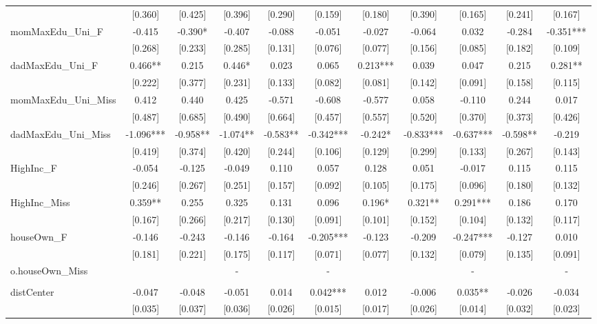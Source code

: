 \documentclass[]{article}
\begin{document}
\begin{tabular}{lcccccccccc}
 & [0.360] & [0.425] & [0.396] & [0.290] & [0.159] & [0.180] & [0.390] & [0.165] & [0.241] & [0.167] \\
momMaxEdu\_Uni\_F & -0.415 & -0.390* & -0.407 & -0.088 & -0.051 & -0.027 & -0.064 & 0.032 & -0.284 & -0.351*** \\
 & [0.268] & [0.233] & [0.285] & [0.131] & [0.076] & [0.077] & [0.156] & [0.085] & [0.182] & [0.109] \\
dadMaxEdu\_Uni\_F & 0.466** & 0.215 & 0.446* & 0.023 & 0.065 & 0.213*** & 0.039 & 0.047 & 0.215 & 0.281** \\
 & [0.222] & [0.377] & [0.231] & [0.133] & [0.082] & [0.081] & [0.142] & [0.091] & [0.158] & [0.115] \\
momMaxEdu\_Uni\_Miss & 0.412 & 0.440 & 0.425 & -0.571 & -0.608 & -0.577 & 0.058 & -0.110 & 0.244 & 0.017 \\
 & [0.487] & [0.685] & [0.490] & [0.664] & [0.457] & [0.557] & [0.520] & [0.370] & [0.373] & [0.426] \\
dadMaxEdu\_Uni\_Miss & -1.096*** & -0.958** & -1.074** & -0.583** & -0.342*** & -0.242* & -0.833*** & -0.637*** & -0.598** & -0.219 \\
 & [0.419] & [0.374] & [0.420] & [0.244] & [0.106] & [0.129] & [0.299] & [0.133] & [0.267] & [0.143] \\
HighInc\_F & -0.054 & -0.125 & -0.049 & 0.110 & 0.057 & 0.128 & 0.051 & -0.017 & 0.115 & 0.115 \\
 & [0.246] & [0.267] & [0.251] & [0.157] & [0.092] & [0.105] & [0.175] & [0.096] & [0.180] & [0.132] \\
HighInc\_Miss & 0.359** & 0.255 & 0.325 & 0.131 & 0.096 & 0.196* & 0.321** & 0.291*** & 0.186 & 0.170 \\
 & [0.167] & [0.266] & [0.217] & [0.130] & [0.091] & [0.101] & [0.152] & [0.104] & [0.132] & [0.117] \\
houseOwn\_F & -0.146 & -0.243 & -0.146 & -0.164 & -0.205*** & -0.123 & -0.209 & -0.247*** & -0.127 & 0.010 \\
 & [0.181] & [0.221] & [0.175] & [0.117] & [0.071] & [0.077] & [0.132] & [0.079] & [0.135] & [0.091] \\
o.houseOwn\_Miss &  &  & - &  & - &  &  & - &  & - \\
 &  &  &  &  &  &  &  &  &  &  \\
distCenter & -0.047 & -0.048 & -0.051 & 0.014 & 0.042*** & 0.012 & -0.006 & 0.035** & -0.026 & -0.034 \\
 & [0.035] & [0.037] & [0.036] & [0.026] & [0.015] & [0.017] & [0.026] & [0.014] & [0.032] & [0.023] \\

\end{tabular}
\end{document}
